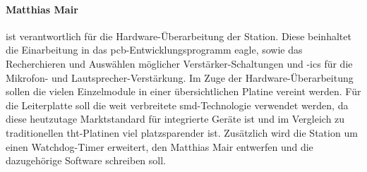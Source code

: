\paragraph{Matthias Mair} ist verantwortlich für die Hardware-Überarbeitung der Station.
Diese beinhaltet die Einarbeitung in das \ac{pcb}-Entwicklungsprogramm \ac{eagle}, sowie das Recherchieren und Auswählen möglicher Verstärker-Schaltungen und -\ac{ic}s für die Mikrofon- und Lautsprecher-Verstärkung.
Im Zuge der Hardware-Überarbeitung sollen die vielen Einzelmodule in einer übersichtlichen Platine vereint werden.
Für die Leiterplatte soll die weit verbreitete \ac{smd}-Technologie verwendet werden, da diese heutzutage Marktstandard für integrierte Geräte ist und im Vergleich zu traditionellen \ac{tht}-Platinen viel platzsparender ist.
Zusätzlich wird die Station um einen Watchdog-Timer erweitert, den Matthias Mair entwerfen und die dazugehörige Software schreiben soll.